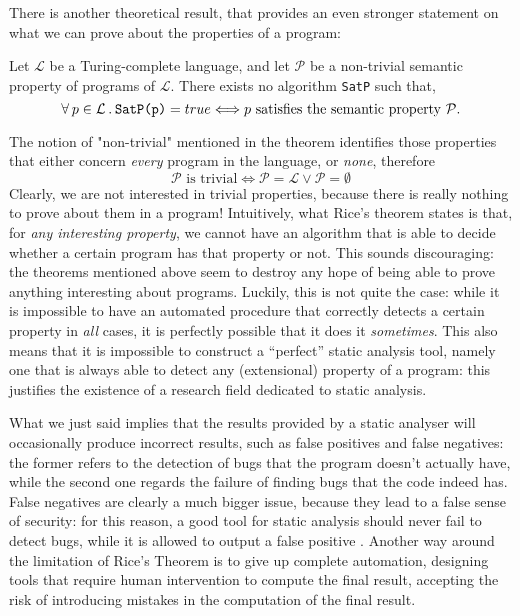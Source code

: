 \documentclass[12pt,a4paper]{book}
\newcommand{\st}{\hspace{2px}.\hspace{2px}}
\theoremstyle{definition}
\begin{document}
	There is another theoretical result, that provides an even stronger statement on what we can prove about the properties of a program:
	\begin{thm} Let $\mathcal{L}$ be a Turing-complete language, and let $\mathcal{P}$ be a non-trivial semantic property of programs of $\mathcal{L}$. There exists no algorithm \texttt{SatP} such that,
		\[
		\forall\hspace{2px}p\in\mathcal{L}\st\texttt{SatP(p)} = true \Longleftrightarrow p\text{ satisfies the semantic property } \mathcal{P}. 	
		\]
	\end{thm}
	The notion of "non-trivial" mentioned in the theorem identifies those properties that either concern \textit{every} program in the language, or \textit{none}, therefore
	\[
	\mathcal{P}\text{ is trivial} \Longleftrightarrow \mathcal{P} = \mathcal{L} \vee \mathcal{P} = \emptyset
	\]
	Clearly, we are not interested in trivial properties, because there is really nothing to prove about them in a program!
	Intuitively, what Rice's theorem states is that, for \textit{any interesting property}, we cannot have an algorithm that is able to decide whether a certain program has that property or not. This sounds discouraging: the theorems mentioned above seem to destroy any hope of being able to prove anything interesting about programs. Luckily, this is not quite the case: while it is impossible to have an automated procedure that correctly detects a certain property in \textit{all} cases, it is perfectly possible that it does it \textit{sometimes}. This also means that it is impossible to construct a ``perfect'' static analysis tool, namely one that is always able to detect any (extensional) property of a program: this justifies the existence of a research field dedicated to static analysis.
	
	What we just said implies that the results provided by a static analyser will occasionally produce incorrect results, such as false positives and false negatives: the former refers to the detection of bugs that the program doesn't actually have, while the second one regards the failure of finding bugs that the code indeed has. False negatives are clearly a much bigger issue, because they lead to a false sense of security: for this reason, a good tool for static analysis should never fail to detect bugs, while it is allowed to output a false positive \cite{Gomes2009}. Another way around the limitation of Rice's Theorem is to give up complete automation, designing tools that require human intervention to compute the final result, accepting the risk of introducing mistakes in the computation of the final result.
	
\end{document}
